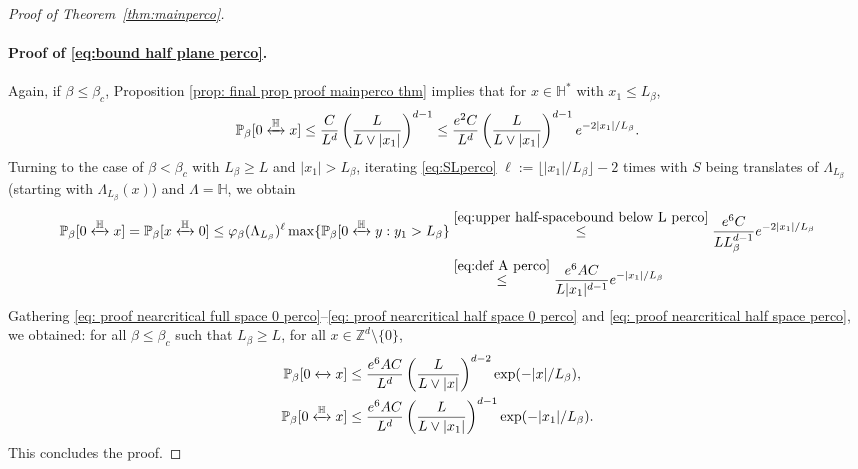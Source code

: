 \documentclass[11pt,a4paper]{article}
\numberwithin{equation}{section}
\theoremstyle{plain}
\theoremstyle{definition}
\newcommand{\connect}{\xleftrightarrow}
\begin{document}
\begin{proof}[Proof of Theorem~\textup{\ref{thm:mainperco}}]
\paragraph{Proof of \eqref{eq:bound half plane perco}.} Again, if $\beta\leq \beta_c$, Proposition \ref{prop: final prop proof mainperco thm} implies that for $x\in \mathbb H^*$ with $x_1\leq L_\beta$,
\begin{equation}\label{eq: proof nearcritical half space 0 perco}
	\mathbb P_\beta[0\connect{\mathbb H\:}x]\leq \frac{C}{L^d}\left(\frac{L}{L\vee |x_1|}\right)^{d-1}\leq \frac{e^2C}{L^d}\left(\frac{L}{L\vee |x_1|}\right)^{d-1}e^{-2|x_1|/L_\beta}.
\end{equation}
Turning to the case of $\beta<\beta_c$ with $L_\beta\geq L$ and $|x_1|>L_\beta$, iterating \eqref{eq:SLperco} $\ell:=\lfloor |x_1|/L_\beta\rfloor-2$ times with $S$ being translates of $\Lambda_{L_\beta}$ (starting with $\Lambda_{L_\beta}(x)$) and $\Lambda=\mathbb H$, we obtain
\begin{align}
	\mathbb P_\beta[0\connect{\mathbb H\:}x]=\mathbb P_\beta[x\connect{\mathbb H\:}0]\leq \varphi_\beta(\Lambda_{L_\beta})^{\ell}\max\{\mathbb P_\beta[0\connect{\mathbb H\:}y: y_1> L_\beta\}&\stackrel{\eqref{eq:upper half-spacebound below L perco}}\leq \frac{e^6C}{LL_\beta^{d-1}}e^{-2|x_1|/L_\beta}
	\\&\stackrel{\eqref{eq:def A perco}}\leq \frac{e^6AC}{L |x_1|^{d-1}}e^{-|x_1|/L_\beta} \label{eq: proof nearcritical half space perco}
\end{align}
Gathering \eqref{eq: proof nearcritical full space 0 perco}--\eqref{eq: proof nearcritical half space 0 perco} and \eqref{eq: proof nearcritical half space perco}, we obtained: for all $\beta\leq \beta_c$ such that $L_\beta\geq L$, for all $x\in \mathbb Z^d\setminus \{0\}$,
\begin{align}
\mathbb P_\beta[0\connect{}x]&\le \frac{e^6AC}{L^d}\left(\frac{L}{L\vee |x|}\right)^{d-2}\exp(-|x|/L_\beta),\\
\mathbb P_\beta[0\connect{\mathbb H\:}x]&\le \frac{e^6AC}{L^d}\left(\frac{L}{L\vee |x_1|}\right)^{d-1}\exp(-|x_1|/L_\beta).
\end{align}
This concludes the proof.
\end{proof}
\end{document}
